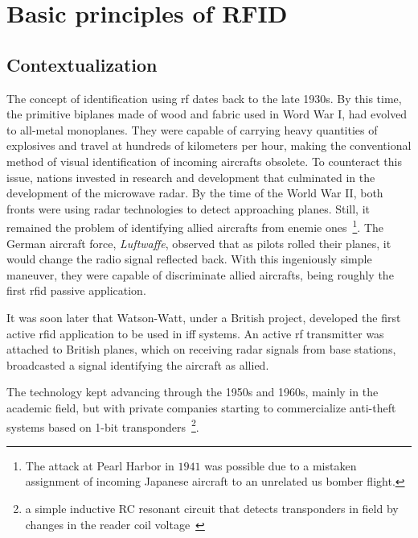 \chapter{Basic principles of RFID}

\section{Contextualization} \label{sec:contextualization}

The concept of identification using \ac{rf} dates back to the late 1930s.
By this time, the primitive biplanes made of wood and fabric used in Word War I, had evolved to all-metal monoplanes. They were capable of carrying heavy quantities of explosives and travel at hundreds of kilometers per hour, making the conventional method of visual identification of incoming aircrafts obsolete.
To counteract this issue, nations invested in research and development that culminated in the development of the microwave radar.
By the time of the World War II, both fronts were using radar technologies to detect approaching planes. 
Still, it remained the problem of identifying allied aircrafts from enemie ones~\footnote{The attack at Pearl Harbor in $1941$ was possible due to a mistaken assignment of incoming Japanese aircraft to an unrelated \ac{us} bomber flight.}.
The German aircraft force, \emph{Luftwaffe}, observed that as pilots rolled their planes, it would change the radio signal reflected back. With this ingeniously simple maneuver, they were capable of discriminate allied aircrafts, being roughly the first \ac{rfid} passive application.~\cite{dobkinRFRFIDSecond2012}

It was soon later that Watson-Watt, under a British project, developed the first active \ac{rfid} application to be used in \ac{iff} systems. An active \ac{rf} transmitter was attached to British planes, which on receiving radar signals from base stations, broadcasted a signal identifying the aircraft as allied.~\cite{HistoryRFIDTechnology}


The technology kept advancing through the 1950s and 1960s, mainly in the academic field, but with private companies starting to commercialize anti-theft systems based on 1-bit transponders~\footnote{a simple inductive RC resonant circuit that detects transponders in field by changes in the reader coil voltage~\cite{andreventuradacruzmarnotozuqueteIdentificacaoPorRFID2018}}.

